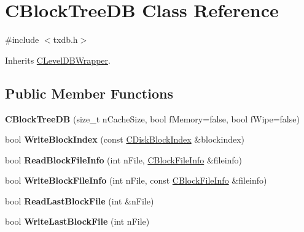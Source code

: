 \hypertarget{class_c_block_tree_d_b}{}\section{C\+Block\+Tree\+DB Class Reference}
\label{class_c_block_tree_d_b}


{\ttfamily \#include $<$txdb.\+h$>$}



Inherits \mbox{\hyperlink{class_c_level_d_b_wrapper}{C\+Level\+D\+B\+Wrapper}}.

\subsection*{Public Member Functions}
\begin{DoxyCompactItemize}
\item 
\mbox{\label{class_c_block_tree_d_b_a52fd1b1dc02c2a4e977099e2c2c50424}} 
{\bfseries C\+Block\+Tree\+DB} (size\+\_\+t n\+Cache\+Size, bool f\+Memory=false, bool f\+Wipe=false)
\item 
\mbox{\label{class_c_block_tree_d_b_a608a04a08445d95e477cb66889c679d0}} 
bool {\bfseries Write\+Block\+Index} (const \mbox{\hyperlink{class_c_disk_block_index}{C\+Disk\+Block\+Index}} \&blockindex)
\item 
\mbox{\label{class_c_block_tree_d_b_a6f951198dc53fbe9194626ff82638656}} 
bool {\bfseries Read\+Block\+File\+Info} (int n\+File, \mbox{\hyperlink{class_c_block_file_info}{C\+Block\+File\+Info}} \&fileinfo)
\item 
\mbox{\label{class_c_block_tree_d_b_ae248032ee1f1303dea54a0b36ad84755}} 
bool {\bfseries Write\+Block\+File\+Info} (int n\+File, const \mbox{\hyperlink{class_c_block_file_info}{C\+Block\+File\+Info}} \&fileinfo)
\item 
\mbox{\label{class_c_block_tree_d_b_adb1276fe2f0e0c4c106660948c581711}} 
bool {\bfseries Read\+Last\+Block\+File} (int \&n\+File)
\item 
\mbox{\label{class_c_block_tree_d_b_ae1f4ea54edf05a056d2da00ea90a9394}} 
bool {\bfseries Write\+Last\+Block\+File} (int n\+File)

\end{DoxyCompactItemize}
